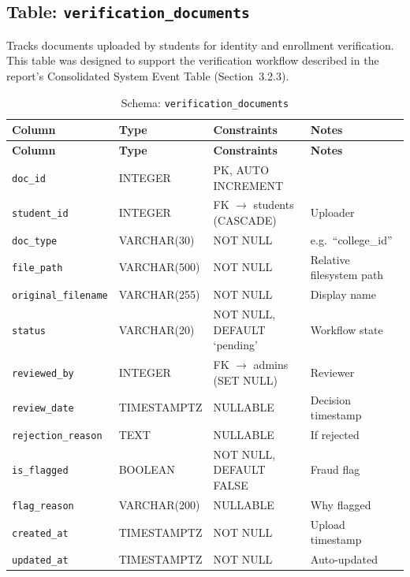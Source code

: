 \documentclass[12pt,a4paper]{article}
\begin{document}
\subsection{Table: \texttt{verification\_documents}}

Tracks documents uploaded by students for identity and enrollment verification. This table was designed to support the verification workflow described in the report's Consolidated System Event Table (Section~3.2.3).

\begin{longtable}{@{}llll@{}}
\caption{Schema: \texttt{verification\_documents}} \\
\toprule
\textbf{Column} & \textbf{Type} & \textbf{Constraints} & \textbf{Notes} \\ \midrule
\endfirsthead
\toprule
\textbf{Column} & \textbf{Type} & \textbf{Constraints} & \textbf{Notes} \\ \midrule
\endhead
\texttt{doc\_id}             & INTEGER       & PK, AUTO INCREMENT         &                        \\
\texttt{student\_id}         & INTEGER       & FK $\rightarrow$ students (CASCADE) & Uploader      \\
\texttt{doc\_type}           & VARCHAR(30)   & NOT NULL                   & e.g.\ ``college\_id''  \\
\texttt{file\_path}          & VARCHAR(500)  & NOT NULL                   & Relative filesystem path \\
\texttt{original\_filename}  & VARCHAR(255)  & NOT NULL                   & Display name           \\
\texttt{status}              & VARCHAR(20)   & NOT NULL, DEFAULT `pending' & Workflow state        \\
\texttt{reviewed\_by}        & INTEGER       & FK $\rightarrow$ admins (SET NULL) & Reviewer       \\
\texttt{review\_date}        & TIMESTAMPTZ   & NULLABLE                   & Decision timestamp     \\
\texttt{rejection\_reason}   & TEXT          & NULLABLE                   & If rejected            \\
\texttt{is\_flagged}         & BOOLEAN       & NOT NULL, DEFAULT FALSE    & Fraud flag             \\
\texttt{flag\_reason}        & VARCHAR(200)  & NULLABLE                   & Why flagged            \\
\texttt{created\_at}         & TIMESTAMPTZ   & NOT NULL                   & Upload timestamp       \\
\texttt{updated\_at}         & TIMESTAMPTZ   & NOT NULL                   & Auto-updated           \\
\bottomrule
\end{longtable}
\end{document}
